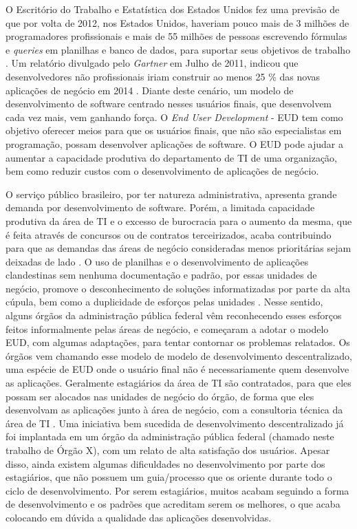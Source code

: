 O Escritório do Trabalho e Estatística dos Estados Unidos fez uma previsão de que por volta de 2012, nos Estados Unidos, haveriam pouco mais de 3 milhões de programadores profissionais e mais de 55 milhões de pessoas escrevendo fórmulas e \textit{queries} em planilhas e banco de dados, para suportar seus objetivos de trabalho \cite{scaffidi2005}. Um relatório divulgado pelo \textit{Gartner} em Julho de 2011, indicou que desenvolvedores não profissionais iriam construir ao menos 25 \% das novas aplicações de negócio em 2014 \cite{paterno2013}. Diante deste cenário, um modelo de desenvolvimento de software centrado nesses usuários finais, que desenvolvem cada vez mais, vem ganhando força. O \textit{End User Development} - EUD tem como objetivo oferecer meios para que os usuários finais, que não são especialistas em programação, possam desenvolver aplicações de software. O EUD pode ajudar a aumentar a capacidade produtiva do departamento de TI de uma organização, bem como reduzir custos com o desenvolvimento de aplicações de negócio.

O serviço público brasileiro, por ter natureza administrativa, apresenta grande demanda por desenvolvimento de software. Porém, a limitada capacidade produtiva da área de TI e o excesso de burocracia para o aumento da mesma, que é feita através de concursos ou de contratos terceirizados, acaba contribuindo para que as demandas das áreas de negócio consideradas menos prioritárias sejam deixadas de lado \cite{artigoTcuGovTI}. O uso de planilhas e o desenvolvimento de aplicações clandestinas sem nenhuma documentação e padrão, por essas unidades de negócio, promove o desconhecimento de soluções informatizadas por parte da alta cúpula, bem como a duplicidade de esforços pelas unidades \cite{slideTCU}. Nesse sentido, alguns órgãos da administração pública federal vêm reconhecendo esses esforços feitos informalmente pelas áreas de negócio, e começaram a adotar o modelo EUD, com algumas adaptações, para tentar contornar os problemas relatados. Os órgãos vem chamando esse modelo de modelo de desenvolvimento descentralizado, uma espécie de EUD onde o usuário final não é necessariamente quem desenvolve as aplicações. Geralmente estagiários da área de TI são contratados, para que eles possam ser alocados nas unidades de negócio do órgão, de forma que eles desenvolvam as aplicações junto à área de negócio, com a consultoria técnica da área de TI \cite{slideTCU}. Uma iniciativa bem sucedida de desenvolvimento descentralizado já foi implantada em um órgão da administração pública federal (chamado neste trabalho de Órgão X), com um relato de alta satisfação dos usuários. Apesar disso, ainda existem algumas dificuldades no desenvolvimento por parte dos estagiários, que não possuem um guia/processo que os oriente durante todo o ciclo de desenvolvimento. Por serem estagiários, muitos acabam seguindo a forma de desenvolvimento e os padrões que acreditam serem os melhores, o que acaba colocando em dúvida a qualidade das aplicações desenvolvidas. 

